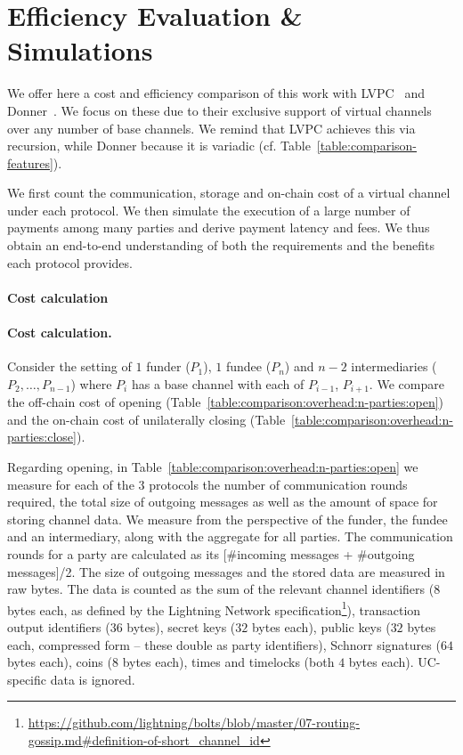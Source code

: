 \section{Efficiency Evaluation \& Simulations}
  \label{section:comparison}
  We offer here a cost and efficiency comparison of this work with
  LVPC~\cite{10.1007/978-3-030-65411-5_18} and Donner~\cite{donner}. We focus on
  these due to their exclusive support of
  virtual channels over any number of base channels. We remind that LVPC
  achieves this via recursion, while Donner
  because it is variadic (cf. Table~\ref{table:comparison-features}).

  We first count the communication, storage and on-chain cost of a virtual
  channel under each protocol. We then simulate the execution of a large number
  of payments among many parties and derive payment latency and fees. We thus
  obtain an end-to-end understanding of both the requirements and the benefits
  each protocol provides.

  \makeatletter%
    {\paragraph{Cost calculation}}%
    {\paragraph{Cost calculation.}}%
  \makeatother%
  Consider the setting of $1$
  funder ($P_1$), $1$ fundee ($P_n$) and $n-2$ intermediaries ($P_2, \dots,
  P_{n-1}$) where $P_i$ has a base channel with each of $P_{i-1}$,
  $P_{i+1}$. We compare the off-chain cost of opening
  (Table~\ref{table:comparison:overhead:n-parties:open}) and the on-chain cost
  of unilaterally closing
  (Table~\ref{table:comparison:overhead:n-parties:close}).

  Regarding opening, in
  Table~\ref{table:comparison:overhead:n-parties:open} we measure for each of
  the $3$ protocols the number of communication rounds required, the total
  size of outgoing messages as well as the amount of space for storing
  channel data. We measure from the perspective of the funder, the fundee
  and an intermediary, along with the aggregate for all parties. The
  communication rounds for a party are calculated as its [\#incoming messages +
  \#outgoing messages]/2. The size of outgoing messages and the stored data are
  measured in raw bytes. The data is counted as the sum of the relevant channel
  identifiers ($8$ bytes each, as defined by the Lightning Network
  specification\footnote{\url{https://github.com/lightning/bolts/blob/master/07-routing-gossip.md\#definition-of-short_channel_id}}),
  transaction output identifiers ($36$ bytes), secret keys ($32$ bytes each),
  public keys ($32$ bytes each, compressed form -- these double as party
  identifiers), Schnorr signatures ($64$ bytes each), coins ($8$ bytes each),
  times and timelocks (both $4$ bytes each). UC-specific data is ignored.

